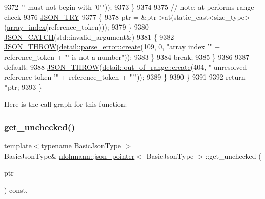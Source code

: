 \begin{DoxyCode}
9372                                                                \textcolor{stringliteral}{"' must not begin with '0'"}));
9373                     \}
9374 
9375                     \textcolor{comment}{// note: at performs range check}
9376                     \hyperlink{json_8hpp_a985d3b82445302c57257f6432f261fe9}{JSON\_TRY}
9377                     \{
9378                         ptr = &ptr->at(static\_cast<size\_type>(\hyperlink{classnlohmann_1_1json__pointer_ac53f5b79dd91da78743c437832f57ce4}{array\_index}(reference\_token)));
9379                     \}
9380                     \hyperlink{json_8hpp_a6954bec49ed2a2dfb938c1131c82740a}{JSON\_CATCH}(std::invalid\_argument&)
9381                     \{
9382                         \hyperlink{json_8hpp_a6c274f6db2e65c1b66c7d41b06ad690f}{JSON\_THROW}(\hyperlink{classnlohmann_1_1detail_1_1parse__error_a9fd60ad6bce80fd99686ad332faefd37}{detail::parse\_error::create}(109, 0,
       \textcolor{stringliteral}{"array index '"} + reference\_token + \textcolor{stringliteral}{"' is not a number"}));
9383                     \}
9384                     \textcolor{keywordflow}{break};
9385                 \}
9386 
9387                 \textcolor{keywordflow}{default}:
9388                     \hyperlink{json_8hpp_a6c274f6db2e65c1b66c7d41b06ad690f}{JSON\_THROW}(\hyperlink{classnlohmann_1_1detail_1_1out__of__range_a3f6d82a6f967c4728a1ec735a7867073}{detail::out\_of\_range::create}(404, \textcolor{stringliteral}{"
      unresolved reference token '"} + reference\_token + \textcolor{stringliteral}{"'"}));
9389             \}
9390         \}
9391 
9392         \textcolor{keywordflow}{return} *ptr;
9393     \}
\end{DoxyCode}
Here is the call graph for this function\+:
\mbox{\label{classnlohmann_1_1json__pointer_a577512ee6b7f030e8872b4d29fa5c3e5}} 
\subsubsection{\texorpdfstring{get\+\_\+unchecked()}{get\_unchecked()}\hspace{0.1cm}{\footnotesize\ttfamily [1/2]}}
{\footnotesize\ttfamily template$<$typename Basic\+Json\+Type $>$ \\
Basic\+Json\+Type\& \hyperlink{classnlohmann_1_1json__pointer}{nlohmann\+::json\+\_\+pointer}$<$ Basic\+Json\+Type $>$\+::get\+\_\+unchecked (\begin{DoxyParamCaption}\item[{Basic\+Json\+Type $\ast$}]{ptr }\end{DoxyParamCaption}) const\hspace{0.3cm}{\ttfamily [inline]}, {\ttfamily [private]}}



